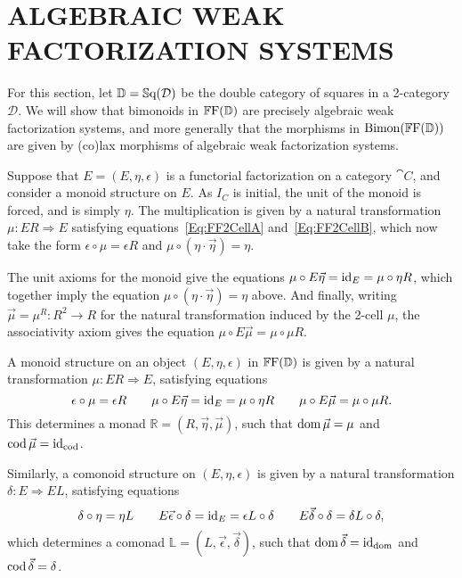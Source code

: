 
\chapter{ALGEBRAIC WEAK FACTORIZATION SYSTEMS}\label{Ch:Awfs}

For this section, let $\mathbb{D}=\mathbb{S}\mathrm{q}(\mathcal{D})$ be the double category of squares in a 2-category $\mathcal{D}$. We will show that bimonoids in $\mathbb{F}\mathrm{F}(\mathbb{D})$ are precisely algebraic weak factorization systems, and more generally that the morphisms in $\mathrm{Bimon}(\mathbb{F}\mathrm{F}(\mathbb{D}))$ are given by (co)lax morphisms of algebraic weak factorization systems.

Suppose that $E=(E,\eta,\epsilon)$ is a functorial factorization on a category $\cat{C}$, and consider a monoid structure on $E$. As $I_C$ is initial, the unit of the monoid is forced, and is simply $\eta$. The multiplication is given by a natural transformation $\mu\colon ER\Rightarrow E$ satisfying equations~\eqref{Eq:FF2CellA} and~\eqref{Eq:FF2CellB}, which now take the form $\epsilon\circ\mu = \epsilon R$ and $\mu\circ(\eta\cdot\vec{\eta})=\eta$.

The unit axioms for the monoid give the equations $\mu\circ E\vec{\eta}=\operatorname{id}_E=\mu\circ\eta R$, which together imply the equation $\mu\circ(\eta\cdot\vec{\eta})=\eta$ above. And finally, writing $\vec{\mu}=\mu^R\colon R^2\to R$ for the natural transformation induced by the 2-cell $\mu$, the associativity axiom gives the equation $\mu\circ E\vec{\mu}=\mu\circ\mu R$.

\begin{proposition}
	A monoid structure on an object $(E,\eta,\epsilon)$ in $\mathbb{F}\mathrm{F}(\mathbb{D})$ is given by a natural transformation $\mu\colon ER\Rightarrow E$, satisfying equations
	\begin{equation}
		\epsilon\circ\mu=\epsilon R \qquad 
			\mu\circ E\vec{\eta}=\operatorname{id}_E=\mu\circ\eta R \qquad 
			\mu\circ E\vec{\mu}=\mu\circ\mu R.
	\end{equation}
	This determines a monad $\mathbb{R}=(R,\vec{\eta},\vec{\mu})$, such that $\operatorname{dom}\vec{\mu}=\mu$ and $\operatorname{cod}\vec{\mu}=\operatorname{id}_{\operatorname{cod}}$.

	Similarly, a comonoid structure on $(E,\eta,\epsilon)$ is given by a natural transformation $\delta\colon E\Rightarrow EL$, satisfying equations
	\begin{equation}
		\delta\circ\eta=\eta L \qquad 
			E\vec{\epsilon}\circ\delta=\operatorname{id}_E=\epsilon L\circ\delta \qquad
			E\vec{\delta}\circ\delta=\delta L\circ\delta,
	\end{equation}
	which determines a comonad $\mathbb{L}=(L,\vec{\epsilon},\vec{\delta})$, such that $\operatorname{dom}\vec{\delta}=\operatorname{id}_{\operatorname{dom}}$ and $\operatorname{cod}\vec{\delta}=\delta$.
\end{proposition}


